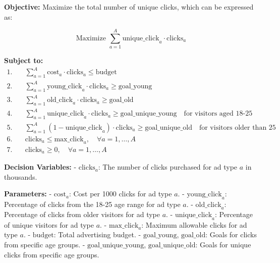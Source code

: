 \documentclass{article}
\begin{document}
\textbf{Objective:}
Maximize the total number of unique clicks, which can be expressed as:

\[
\text{Maximize } \sum_{a=1}^{A} \text{unique\_click}_{a} \cdot \text{clicks}_{a}
\]

\textbf{Subject to:}
\begin{align*}
1. & \quad \sum_{a=1}^{A} \text{cost}_{a} \cdot \text{clicks}_{a} \leq \text{budget} \\
2. & \quad \sum_{a=1}^{A} \text{young\_click}_{a} \cdot \text{clicks}_{a} \geq \text{goal\_young} \\
3. & \quad \sum_{a=1}^{A} \text{old\_click}_{a} \cdot \text{clicks}_{a} \geq \text{goal\_old} \\
4. & \quad \sum_{a=1}^{A} \text{unique\_click}_{a} \cdot \text{clicks}_{a} \geq \text{goal\_unique\_young} \quad \text{for visitors aged 18-25} \\
5. & \quad \sum_{a=1}^{A} \left(1 - \text{unique\_click}_{a}\right) \cdot \text{clicks}_{a} \geq \text{goal\_unique\_old} \quad \text{for visitors older than 25} \\
6. & \quad \text{clicks}_{a} \leq \text{max\_click}_{a}, \quad \forall a = 1, \ldots, A \\
7. & \quad \text{clicks}_{a} \geq 0, \quad \forall a = 1, \ldots, A
\end{align*}

\textbf{Decision Variables:}
- \(\text{clicks}_{a}\): The number of clicks purchased for ad type \(a\) in thousands.

\textbf{Parameters:}
- \(\text{cost}_{a}\): Cost per 1000 clicks for ad type \(a\).
- \(\text{young\_click}_{a}\): Percentage of clicks from the 18-25 age range for ad type \(a\).
- \(\text{old\_click}_{a}\): Percentage of clicks from older visitors for ad type \(a\).
- \(\text{unique\_click}_{a}\): Percentage of unique visitors for ad type \(a\).
- \(\text{max\_click}_{a}\): Maximum allowable clicks for ad type \(a\).
- \(\text{budget}\): Total advertising budget.
- \(\text{goal\_young}\), \(\text{goal\_old}\): Goals for clicks from specific age groups.
- \(\text{goal\_unique\_young}\), \(\text{goal\_unique\_old}\): Goals for unique clicks from specific age groups.
\end{document}
